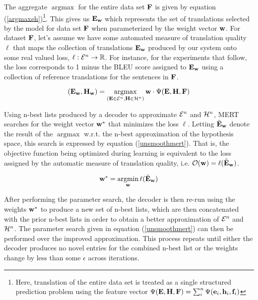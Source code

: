 \documentclass[11pt]{article}
\DeclareMathOperator*{\argmax}{argmax}
\DeclareMathOperator*{\argmin}{argmin}
\begin{document}
The aggregate \mbox{$\argmax$} for the entire data set \mbox{${\bf F}$} is given by equation (\ref{argmaxeh})\footnote{Here, translation of the entire data set is treated as a single structured prediction problem using the feature vector  \mbox{$\Psi({\bf E}, {\bf H}, {\bf F}) = \sum_i^n \Psi({\bf e}_i, {\bf h}_i, {\bf f}_i)$}}. This gives us \mbox{${\bf E}_{\bf w}$} which represents the set of translations selected by the model for data set \mbox{${\bf F}$} when parameterized by the weight vector \mbox{${\bf w}$}. For dataset \mbox{${\bf F}$}, let's assume we have some automated measure of translation quality \mbox{$\ell$} that maps the collection of translations \mbox{${\bf E}_{\bf w}$} produced by our system onto some real valued loss, \mbox{$\ell:{\cal E}^n\rightarrow \mathbb{R}$}. For instance, for the experiments that follow, the loss corresponds to 1 minus the BLEU score assigned to \mbox{${\bf E}_{\bf w}$} using a collection of reference translations for the sentences in \mbox{${\bf F}$}. 

\begin{equation}
({\bf E}_{\bf w}, {\bf H}_{\bf w}) = \argmax_{({\bf E} \in {\cal E}^n, {\bf H} \in {\cal H}^n)} {\bf w} \cdot \Psi({\bf E}, {\bf H}, {\bf F})
\label{argmaxeh}
\end{equation}

Using n-best lists produced by a decoder to approximate \mbox{${\cal E}^n$} and \mbox{${\cal H}^n$}, MERT searches for the weight vector \mbox{${\bf w}^*$} that minimizes the loss \mbox{$\ell$}. Letting \mbox{$\tilde{\bf E}_{\bf w}$} denote the result of the \mbox{$\argmax$} w.r.t\@. the n-best approximation of the hypothesis space, this search is expressed by equation (\ref{unsmoothmert}). That is, the objective function being optimized during learning is equivalent to the loss assigned by the automatic measure of translation quality, i.e. \mbox{${\cal O}({\bf w}) = \ell (\tilde {\bf E}_{\bf w})$}.

\begin{equation}
{\bf w}^* = \argmin_{\bf w} \ell (\tilde {\bf E}_{\bf w}) 
\label{unsmoothmert}
\end{equation}

After performing the parameter search, the decoder is then re-run using the weights \mbox{${\bf w}^*$} to produce a new set of n-best lists, which are then concatenated with the prior n-best lists in order to obtain a better approximation of \mbox{${\cal E}^n$} and \mbox{${\cal H}^n$}. The parameter search given in equation (\ref{unsmoothmert}) can then be performed over the improved approximation. This process repeats until either the decoder produces no novel entries for the combined n-best list or the weights change by less than some \mbox{$\epsilon$} across iterations.  
\end{document}
